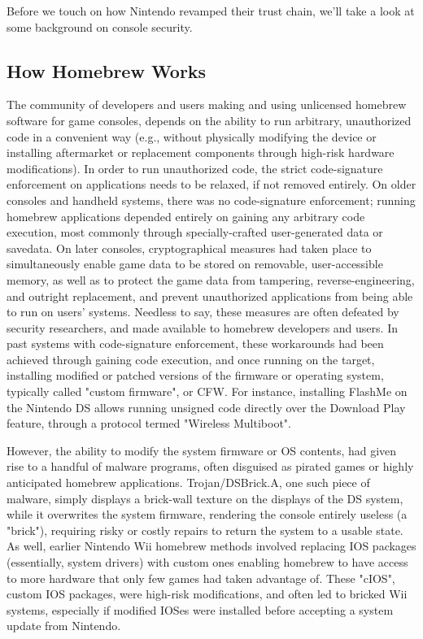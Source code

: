 \documentclass[journal]{IEEEtran}
\begin{document}
Before we touch on how Nintendo revamped their trust chain, we'll take a look at some background on
console security.

\subsection{How Homebrew Works}

The community of developers and users making and using unlicensed homebrew software for game
consoles, depends on the ability to run arbitrary, unauthorized code in a convenient way (e.g.,
without physically modifying the device or installing aftermarket or replacement components through
high-risk hardware modifications). In order to run unauthorized code, the strict code-signature
enforcement on applications needs to be relaxed, if not removed entirely. On older consoles and
handheld systems, there was no code-signature enforcement; running homebrew applications depended
entirely on gaining any arbitrary code execution, most commonly through specially-crafted
user-generated data or savedata. On later consoles, cryptographical measures had taken place to
simultaneously enable game data to be stored on removable, user-accessible memory, as well as to
protect the game data from tampering, reverse-engineering, and outright replacement, and prevent
unauthorized applications from being able to run on users' systems. Needless to say, these measures
are often defeated by security researchers, and made available to homebrew developers and users.
In past systems with code-signature enforcement, these workarounds had been achieved through 
gaining code execution, and once running on the target, installing modified or patched versions of
the firmware or operating system, typically called "custom firmware", or CFW. For instance,
installing FlashMe on the Nintendo DS allows running unsigned code directly over the Download Play
feature, through a protocol termed "Wireless Multiboot".

However, the ability to modify the system firmware or OS contents, had given rise to a handful of
malware programs, often disguised as pirated games or highly anticipated homebrew applications.
Trojan/DSBrick.A, one such piece of malware, simply displays a brick-wall texture on the displays
of the DS system, while it overwrites the system firmware, rendering the console entirely useless
(a "brick"), requiring risky or costly repairs to return the system to a usable state.
As well, earlier Nintendo Wii homebrew methods involved replacing IOS packages (essentially, system
drivers) with custom ones enabling homebrew to have access to more hardware that only few games
had taken advantage of. These "cIOS", custom IOS packages, were high-risk modifications, and often
led to bricked Wii systems, especially if modified IOSes were installed before accepting a system
update from Nintendo.
\end{document}
